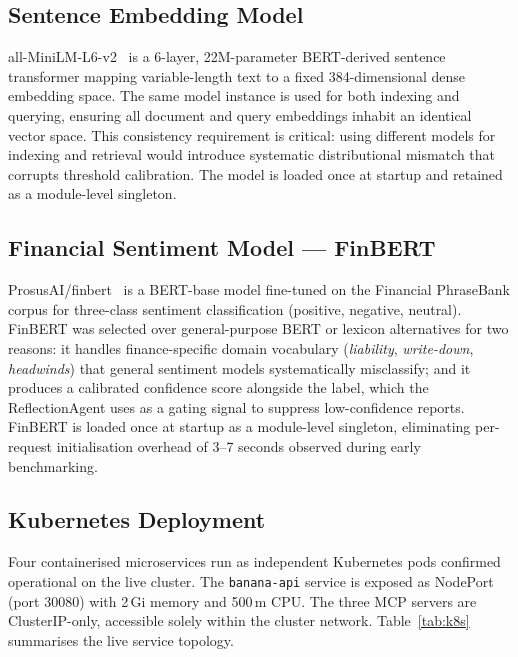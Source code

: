 \documentclass[10pt,journal,compsoc]{IEEEtran}
\newcommand{\node}[1]{\texttt{#1}}
\begin{document}
\subsection{Sentence Embedding Model}

all-MiniLM-L6-v2~\cite{wang2020minilm} is a 6-layer, 22M-parameter
BERT-derived sentence transformer mapping variable-length text to a
fixed 384-dimensional dense embedding space.
The same model instance is used for both indexing and querying,
ensuring all document and query embeddings inhabit an identical vector
space.
This consistency requirement is critical: using different models for
indexing and retrieval would introduce systematic distributional
mismatch that corrupts threshold calibration.
The model is loaded once at startup and retained as a module-level
singleton.

\subsection{Financial Sentiment Model --- FinBERT}

ProsusAI/finbert~\cite{yang2020finbert} is a BERT-base model
fine-tuned on the Financial PhraseBank corpus for three-class
sentiment classification (positive, negative, neutral).
FinBERT was selected over general-purpose BERT or lexicon alternatives
for two reasons: it handles finance-specific domain vocabulary
(\emph{liability}, \emph{write-down}, \emph{headwinds}) that general
sentiment models systematically misclassify; and it produces a
calibrated confidence score alongside the label, which the
ReflectionAgent uses as a gating signal to suppress low-confidence
reports.
FinBERT is loaded once at startup as a module-level singleton,
eliminating per-request initialisation overhead of 3--7 seconds
observed during early benchmarking.

\subsection{Kubernetes Deployment}

Four containerised microservices run as independent Kubernetes pods
confirmed operational on the live cluster.
The \node{banana-api} service is exposed as NodePort (port 30080)
with 2\,Gi memory and 500\,m CPU.
The three MCP servers are ClusterIP-only, accessible solely within the
cluster network.
Table~\ref{tab:k8s} summarises the live service topology.
\end{document}
